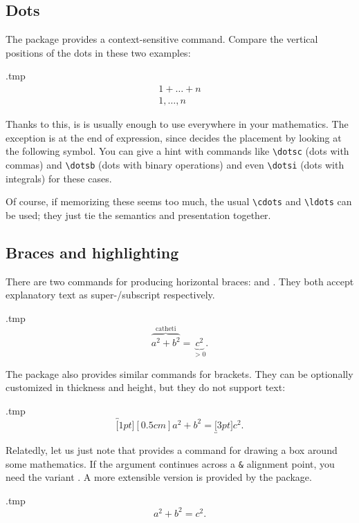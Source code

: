 %
%
\subsection{Dots}

The  package provides a context-sensitive  command.
Compare the vertical positions of the dots in these two examples:
%
\begin{VerbatimOut}{\jobname.tmp}
\begin{gather*}
1 + \dots + n\\
1, \dots, n
\end{gather*}
\end{VerbatimOut}
\ShowExample
%
Thanks to this, is is usually enough to use  everywhere in your mathematics.
The exception is at the end of expression,
since  decides the placement by looking at the following symbol.
You can give a hint with commands like \verb|\dotsc| (dots with commas)
and \verb|\dotsb| (dots with binary operations)
and even \verb|\dotsi| (dots with integrals) for these cases.

Of course, if memorizing these seems too much, the usual \verb|\cdots| and \verb|\ldots| can be used;
they just tie the semantics and presentation together.


%
%
\subsection{Braces and highlighting}
There are two commands for producing horizontal braces:
 and .
They both accept explanatory text as super-/subscript respectively.
%
\begin{VerbatimOut}{\jobname.tmp}
\[
\overbrace{a^2 + b^2}^{\text{catheti}}
= \underbrace{c^2}_{> 0}.
\]
\end{VerbatimOut}
\ShowExample

The  package also provides similar commands for brackets.
They can be optionally customized in thickness and height,
but they do not support text:
%
\begin{VerbatimOut}{\jobname.tmp}
\[
\overbracket[1pt][0.5cm]{a^2 + b^2}
= \underbracket[3pt]{c^2}.
\]
\end{VerbatimOut}
\ShowExample

Relatedly, let us just note that  provides a  command
for drawing a box around some mathematics.
If the argument continues across a \verb|&| alignment point,
you need the  variant .
A more extensible version is provided by the  package.
%
\begin{VerbatimOut}{\jobname.tmp}
\[
\boxed{a^2 + b^2} = c^2.
\]
\end{VerbatimOut}
\ShowExample

